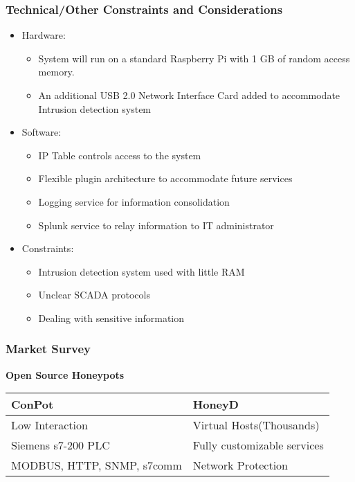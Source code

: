 \begin{frame}
\frametitle{Technical/Other Constraints and Considerations}

\begin{itemize}
\item Hardware:
\begin{itemize}
\item System will run on a standard Raspberry Pi with 1 GB of random access memory.  
\item An additional USB 2.0 Network Interface Card added to accommodate Intrusion detection system
\end{itemize}

\item Software:
\begin{itemize}
\item IP Table controls access to the system
\item Flexible plugin architecture to accommodate future services
\item Logging service for information consolidation
\item Splunk service to relay information to IT administrator
\end{itemize}

\item Constraints:
\begin{itemize}
\item Intrusion detection system used with little RAM
\item Unclear SCADA protocols
\item Dealing with sensitive information
\end{itemize}


\end{itemize}

\end{frame}

\begin{frame}
\frametitle{Market Survey}

\begin{center}
\textbf{Open Source Honeypots}
\end{center}

\begin{tabular}{l | l}
\toprule
\textbf{ConPot} & \textbf{HoneyD} \\
\midrule
Low Interaction & Virtual Hosts(Thousands) \\
Siemens s7-200 PLC & Fully customizable services \\
MODBUS, HTTP, SNMP, s7comm & Network Protection \\
\bottomrule
\end{tabular}


\end{frame}

